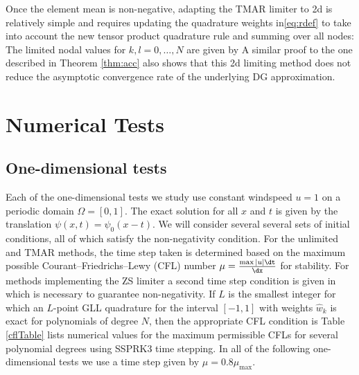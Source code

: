 \documentclass{ametsoc}
\begin{document}
Once the element mean is non-negative, adapting the TMAR limiter to 2d is relatively simple and requires updating the quadrature weights in\eqref{eq:rdef} to take into account the new tensor product quadrature rule and summing over all nodes:
The limited nodal values for $k,l=0,\dots,N$ are given by
A similar proof to the one described in Theorem \ref{thm:acc} also shows that this 2d limiting method does not reduce the asymptotic convergence rate of the underlying DG approximation.

\section{Numerical Tests} \label{sec:numTest}
\subsection*{One-dimensional tests}
Each of the one-dimensional tests we study use constant windspeed $u=1$ on a periodic domain $\Omega = [0,1]$. The exact solution for all $x$ and $t$ is given by the translation $\psi(x,t) = \psi_0(x-t)$. We will consider several several sets of initial conditions, all of which satisfy the non-negativity condition. For the unlimited and TMAR methods, the time step taken is determined based on the maximum possible Courant--Friedrichs--Lewy (CFL) number $\mu = \frac{\max |u| \dt}{\dx}$ for stability. For methods implementing the ZS limiter a second time step condition is given in \cite{Zhang2010} which is necessary to guarantee non-negativity. If $L$ is the smallest integer for which an $L$-point GLL quadrature for the interval $[-1,1]$ with weights $\hat{w}_k$ is exact for polynomials of degree $N$, then the appropriate CFL condition is 
Table \ref{cflTable} lists numerical values for the maximum permissible CFLs for several polynomial degrees using SSPRK3 time stepping. In all of the following one-dimensional tests we use a time step given by $\mu = 0.8 \mu_{\text{max}}$. 
\end{document}
